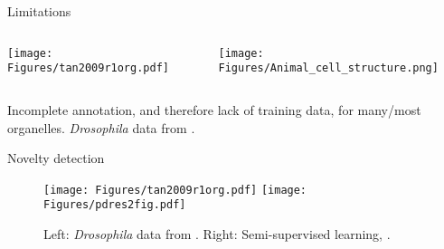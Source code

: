 \begin{frame}{Limitations}
  \begin{columns}[t]
    \begin{column}[T]{0.43\textwidth}
      \begin{centering}
        \texttt{[image: Figures/tan2009r1org.pdf]}
      \end{centering} 
    \end{column}
    \begin{column}[T]{0.56\textwidth}      
      \texttt{[image: Figures/Animal\_cell\_structure.png]}
    \end{column}
  \end{columns}          
  Incomplete annotation, and therefore lack of training data, for
  many/most organelles. \textit{Drosophila} data from \cite{Tan2009}.
\end{frame}

\begin{frame}{Novelty detection}
  \begin{figure}
    \texttt{[image: Figures/tan2009r1org.pdf]}
    \texttt{[image: Figures/pdres2fig.pdf]}
    \caption{Left: \textit{Drosophila} data from
      \cite{Tan2009}. Right: Semi-supervised learning,
      \cite{Breckels:2013}.}
  \end{figure} 
\end{frame}


